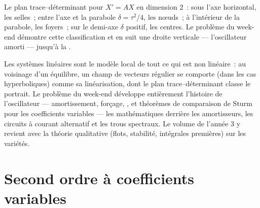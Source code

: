 \begin{omfigure}

{\small Le plan trace--déterminant pour $X' = AX$ en dimension
$2$~: sous l'axe horizontal, les selles~; entre l'axe et
la parabole $\delta = \tau^2/4$, les nœuds~; à l'intérieur de la
parabole, les foyers~; sur le demi-axe $\delta$ positif, les
centres. Le problème du week-end démontre cette classification et
en suit une droite verticale --- l'oscillateur amorti --- jusqu'à
la .}
\end{omfigure}

\begin{remark}
Les systèmes linéaires sont le modèle local de tout ce qui est non
linéaire~: au voisinage d'un équilibre, un champ de vecteurs
régulier se comporte (dans les cas hyperboliques) comme sa
linéarisation, dont le plan trace--déterminant classe le portrait.
Le problème du week-end développe entièrement l'histoire de
l'oscillateur --- amortissement, forçage, , et théorèmes
de comparaison de Sturm pour les coefficients variables --- les
mathématiques derrière les amortisseurs, les circuits à courant
alternatif et les trous spectraux. Le volume de l'année 3 y revient
avec la théorie qualitative (flots, stabilité, intégrales
premières) sur les variétés.
\end{remark}

\section{Second ordre à coefficients variables}

